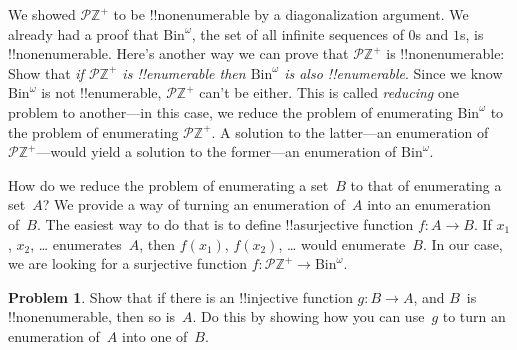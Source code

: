 \documentclass[10pt,a4paper]{article}
\theoremstyle{plain}
\theoremstyle{definition}
\newtheorem{prob}{Problem}[section]
\theoremstyle{remark}
\providecommand{\PosInt}{\mathbb{Z}^{+}}
\providecommand{\Bin}{\mathrm{Bin}}
\providecommand{\Pow}{\mathcal{P}}
\begin{document}
We showed $\Pow{\PosInt}$ to be !!{nonenumerable} by a diagonalization
argument. We already had a proof that $\Bin^\omega$, the set of all
infinite sequences of $0$s and $1$s, is !!{nonenumerable}.  Here's
another way we can prove that $\Pow{\PosInt}$ is !!{nonenumerable}:
Show that \emph{if $\Pow{\PosInt}$ is !!{enumerable} then $\Bin^\omega$
  is also !!{enumerable}}.  Since we know $\Bin^\omega$ is not
!!{enumerable}, $\Pow{\PosInt}$ can't be either.  This is called
\emph{reducing} one problem to another---in this case, we reduce the
problem of enumerating $\Bin^\omega$ to the problem of enumerating
$\Pow{\PosInt}$.  A solution to the latter---an enumeration of
$\Pow{\PosInt}$---would yield a solution to the former---an enumeration
of $\Bin^\omega$.

How do we reduce the problem of enumerating a set~$B$ to that of
enumerating a set~$A$?  We provide a way of turning an enumeration
of~$A$ into an enumeration of~$B$.  The easiest way to do that is to
define !!a{surjective} function $f\colon A \to B$.  If $x_1$, $x_2$,
\dots{} enumerates~$A$, then $f(x_1)$, $f(x_2)$, \dots{} would
enumerate~$B$.  In our case, we are looking for a surjective
function $f\colon \Pow{\PosInt} \to \Bin^\omega$.

\begin{prob}
Show that if there is an !!{injective} function $g\colon B \to A$, and
$B$~is !!{nonenumerable}, then so is~$A$. Do this by showing how you
can use~$g$ to turn an enumeration of~$A$ into one of~$B$.
\end{prob}
\end{document}
